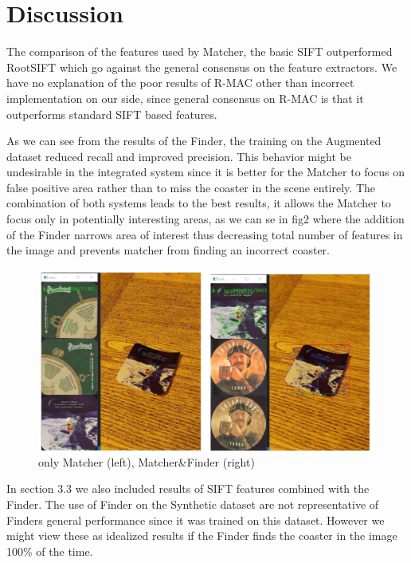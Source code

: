 \documentclass{article}
\begin{document}
\section{Discussion}

The comparison of the features used by Matcher, the basic SIFT outperformed RootSIFT which go against the general consensus on the feature extractors.
We have no explanation of the poor results of R-MAC other than incorrect implementation on our side, since general consensus on R-MAC is that it outperforms standard SIFT based features.

As we can see from the results of the Finder, the training on the Augmented dataset reduced recall and improved precision.
This behavior might be undesirable in the integrated system since it is better for the Matcher to focus on false positive area rather than to miss the coaster in the scene entirely.
The combination of both systems leads to the best results, it allows the Matcher to focus only in potentially interesting areas, as we can se in fig2 where the addition of the Finder narrows area of interest thus decreasing total number of features in the image and prevents matcher from finding an incorrect coaster.

\begin{figure}[H]
    \center
    \includegraphics[scale=0.4]{img/addedFinder.jpg}
    \caption{only Matcher (left), Matcher\&Finder (right)}
\end{figure}

In section 3.3 we also included results of SIFT features combined with the Finder. The use of Finder on the Synthetic dataset are not representative of Finders general performance since it was trained on this dataset.
However we might view these as idealized results if the Finder finds the coaster in the image 100\% of the time.
\end{document}

